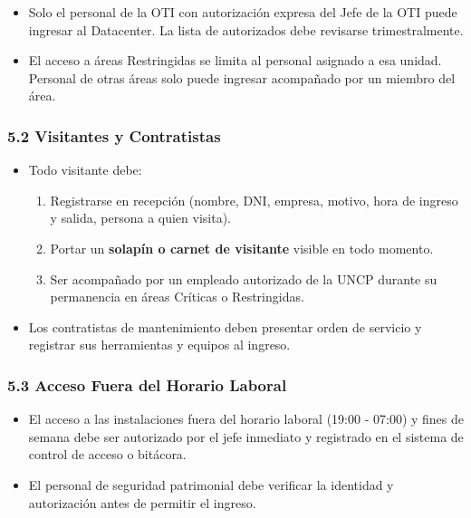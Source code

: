 \documentclass[10pt,letterpaper]{article}
\begin{document}
\begin{itemize}
\tightlist
\item
  Solo el personal de la OTI con autorización expresa del Jefe de la OTI
  puede ingresar al Datacenter. La lista de autorizados debe revisarse
  trimestralmente.
\item
  El acceso a áreas Restringidas se limita al personal asignado a esa
  unidad. Personal de otras áreas solo puede ingresar acompañado por un
  miembro del área.
\end{itemize}

\subsubsection{5.2 Visitantes y
Contratistas}\label{visitantes-y-contratistas}

\begin{itemize}
\tightlist
\item
  Todo visitante debe:

  \begin{enumerate}
  \def\labelenumi{\arabic{enumi}.}
  \tightlist
  \item
    Registrarse en recepción (nombre, DNI, empresa, motivo, hora de
    ingreso y salida, persona a quien visita).
  \item
    Portar un \textbf{solapín o carnet de visitante} visible en todo
    momento.
  \item
    Ser acompañado por un empleado autorizado de la UNCP durante su
    permanencia en áreas Críticas o Restringidas.
  \end{enumerate}
\item
  Los contratistas de mantenimiento deben presentar orden de servicio y
  registrar sus herramientas y equipos al ingreso.
\end{itemize}

\subsubsection{5.3 Acceso Fuera del Horario
Laboral}\label{acceso-fuera-del-horario-laboral}

\begin{itemize}
\tightlist
\item
  El acceso a las instalaciones fuera del horario laboral (19:00 -
  07:00) y fines de semana debe ser autorizado por el jefe inmediato y
  registrado en el sistema de control de acceso o bitácora.
\item
  El personal de seguridad patrimonial debe verificar la identidad y
  autorización antes de permitir el ingreso.
\end{itemize}
\end{document}
